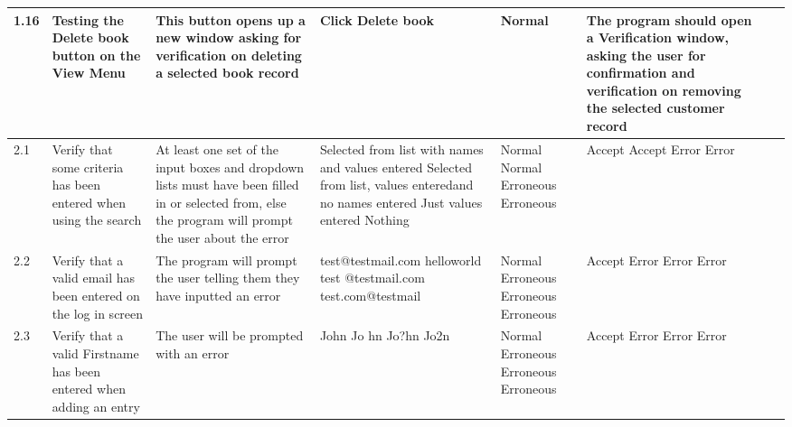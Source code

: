 \begin{landscape}
\begin{center}
\begin{longtable}{|p{1.5cm}|p{2cm}|p{2.5cm}|p{2.5cm}|p{2cm}|p{2cm}|p{2cm}|p{2cm}|}
        1.16 & Testing the Delete book button on the View Menu & This button opens up a new window asking for verification on deleting a selected book record & Click Delete book & Normal & The program should open a Verification window, asking the user for confirmation and verification on removing the selected customer record & & \\ \hline
        2.1 & Verify that some criteria has been entered when using the search & At least one set of the input boxes and dropdown lists must have been filled in or selected from, else the program will prompt the user about the error & Selected from list with names and values entered \newline Selected from list, values enteredand no names entered \newline Just values entered \newline Nothing   & Normal \newline Normal \newline Erroneous \newline Erroneous & Accept \newline Accept \newline Error \newline Error & & \\ \hline
        2.2 & Verify that a valid email has been entered on the log in screen &  The program will prompt the user telling them they have inputted an error & test@testmail.com \newline helloworld \newline test @testmail.com \newline test.com@testmail & Normal \newline Erroneous \newline Erroneous \newline Erroneous & Accept \newline Error \newline Error \newline Error & & \\ \hline
        2.3 & Verify that a valid Firstname has been entered when adding an entry & The user will be prompted with an error & John \newline Jo hn \newline Jo?hn \newline Jo2n & Normal \newline Erroneous \newline Erroneous \newline Erroneous & Accept \newline Error \newline Error \newline Error & & \\ \hline

\end{longtable}
\end{center}
\end{landscape}
